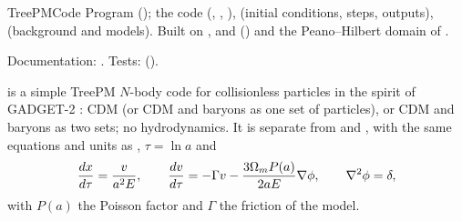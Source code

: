 \begin{modulebox}{TreePMCode}
Program  (); the code  (,
, ),  (initial conditions, steps, outputs),
 (background and models). Built on , 
and  () and the
Peano--Hilbert domain of .\par
Documentation: . Tests:  ().
\end{modulebox}

 is a simple TreePM $N$-body code for collisionless particles in the spirit of GADGET-2
\cite{Springel2005}: CDM (or CDM and baryons as one set of particles), or CDM and baryons as two sets; no
hydrodynamics. It is separate from  and , with the same equations and units as
, $\tau=\ln a$ and
\begin{equation}
\frac{dx}{d\tau}=\frac{v}{a^2E},\qquad\frac{dv}{d\tau}=-\Gamma v-\frac{3\Omega_mP(a)}{2aE}\nabla\phi,\qquad\nabla^2\phi=\delta,
\end{equation}
with $P(a)$ the Poisson factor and $\Gamma$ the friction of the model.
